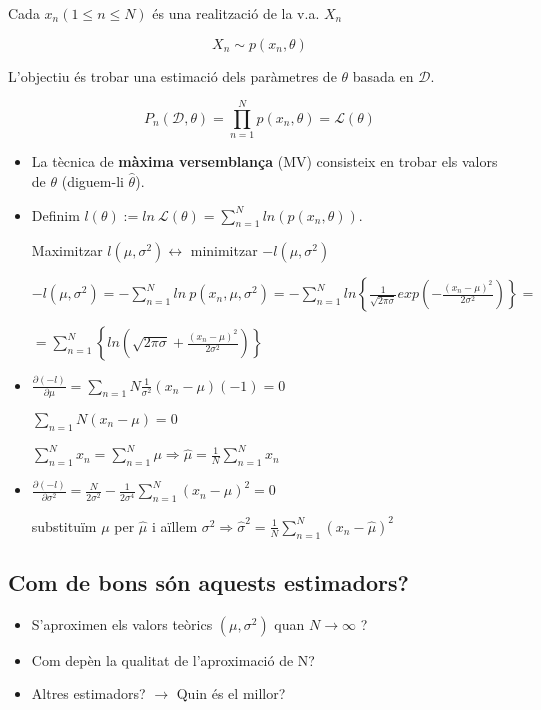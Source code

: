\documentclass[a4paper]{article}
\begin{document}
Cada $x_n (1 \le n \le N)$ és una realització de la v.a. $X_n$

\[ X_n \sim p(x_n, \theta) \]

L'objectiu és trobar una estimació dels paràmetres de $\theta$ basada en $\mathcal{D}$. 

\[ P_n(\mathcal{D}, \theta) = \prod_{n=1}^N p(x_n, \theta) = \mathcal{L}(\theta) \]



\begin{itemize}
	\item La tècnica de \textbf{màxima versemblança} (MV) consisteix en trobar els valors de $\theta$ (diguem-li  $\hat{\theta}$).
	
	\item Definim $l(\theta) := ln\ \mathcal{L}(\theta) = \sum_{n=1}^{N} ln(p(x_n, \theta))$. 
	
	Maximitzar $l(\mu, \sigma^2) \leftrightarrow$ minimitzar $-l(\mu, \sigma^2)$
	
	$ -l(\mu, \sigma^2) = -\sum_{n=1}^N ln\ p(x_n, \mu, \sigma^2) =  -\sum_{n=1}^N ln\left\{ \frac{1}{\sqrt{2\pi\sigma}} exp\left(-\frac{(x_n - \mu)^2}{2\sigma^2}\right) \right\} = $ 
	
	$ = \boxed{\sum_{n=1}^N \left\{ ln(\sqrt{2\pi\sigma} + \frac{(x_n - \mu)^2}{2\sigma^2}) \right\}}$

	\item $ \frac{\partial(-l)}{\partial\mu} = \sum_{n=1}{N} \frac{1}{\sigma^2} (x_n-\mu)(-1) = 0 $
	
	$ \sum_{n=1}{N} (x_n - \mu) = 0$ 
	
	$\sum_{n=1}^N x_n = \sum_{n=1}^N \mu \Rightarrow \boxed{\hat{\mu} = \frac{1}{N}\sum_{n=1}^N x_n}$
	\item $\frac{\partial(-l)}{\partial\sigma^2} = \frac{N}{2\sigma^2} - \frac{1}{2\sigma^4}\sum_{n=1}^N (x_n - \mu)^2 = 0$
	
	substituïm $\mu$ per $\hat{\mu}$ i aïllem $\sigma^2 \Rightarrow \hat{\sigma}^2 = \frac{1}{N} \sum_{n=1}^N (x_n - \hat{\mu})^2$ 
\end{itemize}

\subsection{Com de bons són aquests estimadors?}

\begin{itemize}
	\item S'aproximen els valors teòrics $(\mu, \sigma^2)$ quan $N\rightarrow\infty$ ?
	\item Com depèn la qualitat de l'aproximació de N?
	\item Altres estimadors? $\rightarrow$ Quin és el millor?
\end{itemize}
\end{document}
